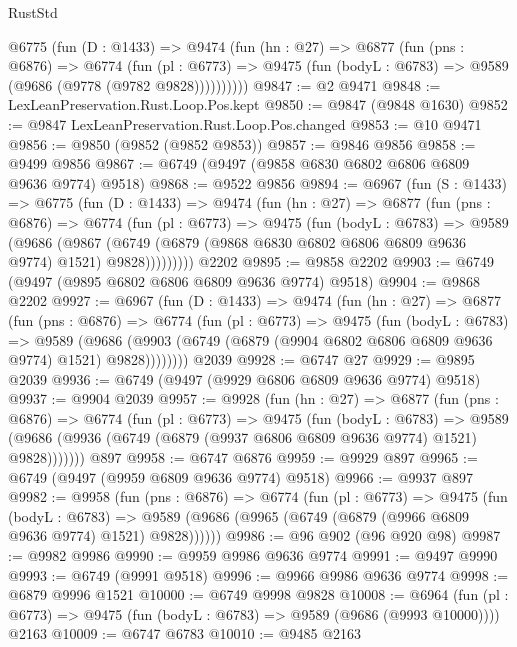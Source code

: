 \begin{lexlean}{RustStd}
\begin{coremodule}
      @6775
        (fun (D : @1433) =>
        @9474
          (fun (hn : @27) =>
          @6877
            (fun (pns : @6876) =>
            @6774
              (fun (pl : @6773) =>
              @9475 (fun (bodyL : @6783) => @9589 (@9686 (@9778 (@9782 @9828))))))))))
@9847 := @2 @9471
@9848 := LexLeanPreservation.Rust.Loop.Pos.kept
@9850 := @9847 (@9848 @1630)
@9852 := @9847 LexLeanPreservation.Rust.Loop.Pos.changed
@9853 := @10 @9471
@9856 := @9850 (@9852 (@9852 @9853))
@9857 := @9846 @9856
@9858 := @9499 @9856
@9867 := @6749 (@9497 (@9858 @6830 @6802 @6806 @6809 @9636 @9774) @9518)
@9868 := @9522 @9856
@9894 := @6967
    (fun (S : @1433) =>
    @6775
      (fun (D : @1433) =>
      @9474
        (fun (hn : @27) =>
        @6877
          (fun (pns : @6876) =>
          @6774
            (fun (pl : @6773) =>
            @9475
              (fun (bodyL : @6783) =>
              @9589
                (@9686
                  (@9867
                    (@6749 (@6879 (@9868 @6830 @6802 @6806 @6809 @9636 @9774) @1521) @9828)))))))))
    @2202
@9895 := @9858 @2202
@9903 := @6749 (@9497 (@9895 @6802 @6806 @6809 @9636 @9774) @9518)
@9904 := @9868 @2202
@9927 := @6967
    (fun (D : @1433) =>
    @9474
      (fun (hn : @27) =>
      @6877
        (fun (pns : @6876) =>
        @6774
          (fun (pl : @6773) =>
          @9475
            (fun (bodyL : @6783) =>
            @9589
              (@9686 (@9903 (@6749 (@6879 (@9904 @6802 @6806 @6809 @9636 @9774) @1521) @9828))))))))
    @2039
@9928 := @6747 @27
@9929 := @9895 @2039
@9936 := @6749 (@9497 (@9929 @6806 @6809 @9636 @9774) @9518)
@9937 := @9904 @2039
@9957 := @9928
    (fun (hn : @27) =>
    @6877
      (fun (pns : @6876) =>
      @6774
        (fun (pl : @6773) =>
        @9475
          (fun (bodyL : @6783) =>
          @9589 (@9686 (@9936 (@6749 (@6879 (@9937 @6806 @6809 @9636 @9774) @1521) @9828)))))))
    @897
@9958 := @6747 @6876
@9959 := @9929 @897
@9965 := @6749 (@9497 (@9959 @6809 @9636 @9774) @9518)
@9966 := @9937 @897
@9982 := @9958
    (fun (pns : @6876) =>
    @6774
      (fun (pl : @6773) =>
      @9475
        (fun (bodyL : @6783) =>
        @9589 (@9686 (@9965 (@6749 (@6879 (@9966 @6809 @9636 @9774) @1521) @9828))))))
@9986 := @96 @902 (@96 @920 @98)
@9987 := @9982 @9986
@9990 := @9959 @9986 @9636 @9774
@9991 := @9497 @9990
@9993 := @6749 (@9991 @9518)
@9996 := @9966 @9986 @9636 @9774
@9998 := @6879 @9996 @1521
@10000 := @6749 @9998 @9828
@10008 := @6964
    (fun (pl : @6773) => @9475 (fun (bodyL : @6783) => @9589 (@9686 (@9993 @10000))))
    @2163
@10009 := @6747 @6783
@10010 := @9485 @2163

\end{coremodule}
\end{lexlean}
